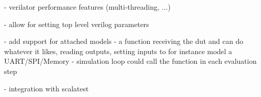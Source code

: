 
- verilator performance features (multi-threading, ...)

- allow for setting top level verilog parameters

- add support for attached models
- a function receiving the dut and can do whatever it likes, reading outputs, setting inputs to for instance model a
UART/SPI/Memory
- simulation loop could call the function in each evaluation step

- integration with scalatest


